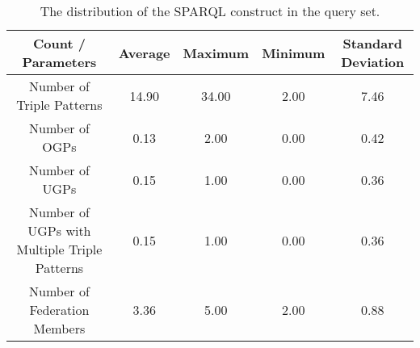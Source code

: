 \begin{table}
    \begin{center}
        \begin{tabular}{|*{5}{c|}}
        \hline
        Count / Parameters & Average & Maximum & Minimum & Standard Deviation \\ 
        \hline \hline
        Number of Triple Patterns & 14.90 & 34.00 & 2.00 & 7.46 \\ 
        \hline
        Number of OGPs & 0.13 & 2.00 & 0.00 & 0.42 \\ 
        \hline
        Number of UGPs & 0.15 & 1.00 & 0.00 & 0.36 \\ 
        \hline
        Number of UGPs with Multiple Triple Patterns & 0.15 & 1.00 & 0.00 & 0.36 \\ 
        \hline
        Number of Federation Members & 3.36 & 5.00 & 2.00 & 0.88 \\  
        \hline
        \end{tabular}
    \end{center}
    \caption{
        The distribution of the SPARQL construct in the query set.
    }
    \label{tab:statQuery}
\end{table}